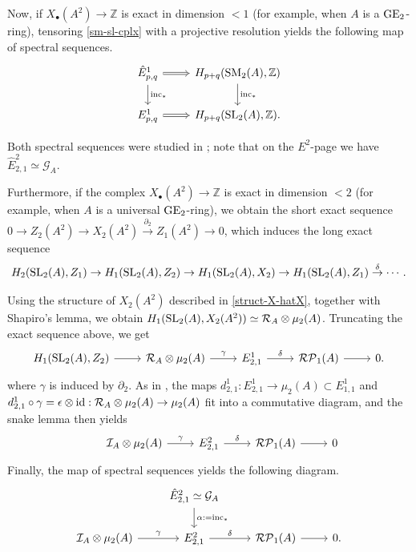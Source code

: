 \documentclass[11pt]{amsart}
\theoremstyle{definition}
\theoremstyle{plain}
\numberwithin{equation}{section}
\newcommand{\z}{\mathbb{Z}}
\newcommand{\GG}{\mathcal{G}}
\newcommand{\RR}{\mathcal{R}}
\newcommand{\II}{\mathcal{I}}
\newcommand{\RP}{\mathcal{RP}}
\newcommand{\GE}{{\rm GE}}
\newcommand{\SL}{\mathit{{\rm SL}}}
\newcommand{\SM}{\mathit{{\rm SM}}}
\newcommand{\id}{{\rm id}}
\newcommand{\inc}{{\rm inc}}
\begin{document}
Now, if $X_{\bullet}(A^2)\to\z$ is exact in dimension $<1$ (for example, when $A$ is a $\GE_2$-ring), tensoring \eqref{sm-sl-cplx} with a projective resolution yields the following map of spectral sequences.
\begin{equation}\label{map-s-seq}
    \begin{tikzcd}
    \hat{E}^1_{p,q}\ar[r,Rightarrow]\ar[d,"\inc_*"] & H_{p+q}(\SM_2(A),\z)\ar[d,"\inc_*"]\\
    E^1_{p,q}\ar[r,Rightarrow] & H_{p+q}(\SL_2(A),\z).
\end{tikzcd}
\end{equation}

Both spectral sequences were studied in \cite[\S 1 and \S 5]{B-E--2023}; note that on the $E^2$-page we have $\hat{E}^2_{2,1}\simeq\GG_A$. 

Furthermore, if the complex $X_{\bullet}(A^2)\to\z$ is exact in dimension $<2$ (for example, when $A$ is a universal $\GE_2$-ring), we obtain the short exact sequence $0\to Z_2(A^2)\to X_2(A^2) \overset{\partial_2}{\to} Z_1(A^2)\to 0$, which induces the long exact sequence
\begin{equation}\label{long-eseq}
H_2(\SL_2(A),Z_1) \to H_1(\SL_2(A),Z_2) \to H_1(\SL_2(A),X_2)\to H_1(\SL_2(A),Z_1)\overset{\delta}{\to} \cdots.
\end{equation}

Using the structure of $X_2(A^2)$ described in \eqref{struct-X-hatX}, together with Shapiro's lemma, we obtain $H_1(\SL_2(A),X_2(A^2))\simeq\RR_A\otimes\mu_2(A)$. Truncating the exact sequence above, we get
\[
\begin{tikzcd}
H_1(\SL_2(A),Z_2) \ar[r] & \RR_A\otimes\mu_2(A)\ar[r,"\gamma"] & E^1_{2,1} \ar[r,"\delta"] & \RP_1(A)\ar[r] & 0.
\end{tikzcd}
\]
where $\gamma$ is induced by $\partial_2$. As in \cite[\S 4]{B-E--2023}, the maps $d^1_{2,1}:E^1_{2,1}\to\mu_2(A)\subset E^1_{1,1}$ and $d^1_{2,1}\circ\gamma=\epsilon\otimes\id:\RR_A\otimes\mu_2(A)\to\mu_2(A)$ fit into a commutative diagram, and the snake lemma then yields
\begin{equation}
    \label{d-gam-seq}
    \begin{tikzcd}
        &\II_A\otimes\mu_2(A)\ar[r,"\gamma"] & E^2_{2,1} \ar[r,"\delta"] & \RP_1(A)\ar[r] & 0 
    \end{tikzcd}
\end{equation}
Finally, the map of spectral sequences yields the following diagram.
\begin{equation}\label{dia-gam-alpha}
\begin{tikzcd}
& \hat{E}^2_{2,1}\simeq\GG_A\ar[d,"\alpha:=\inc_*"] & &\\
\II_A\otimes\mu_2(A)\ar[r,"\gamma"] & E^2_{2,1} \ar[r,"\delta"] & \RP_1(A)\ar[r] & 0.
\end{tikzcd}
\end{equation}
\end{document}
